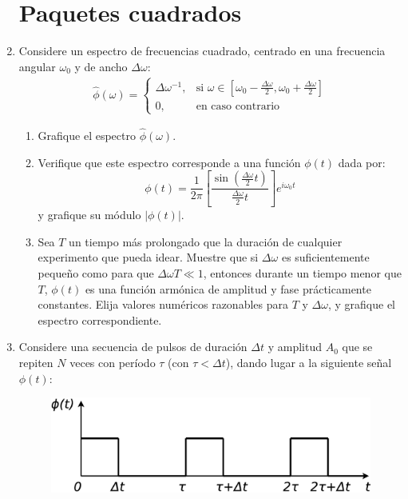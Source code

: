 \documentclass[11pt,spanish]{article}
\begin{document}
\begin{enumerate}
\section*{Paquetes cuadrados}


    \item Considere un espectro de frecuencias cuadrado, centrado en una
    frecuencia angular $\omega_0$ y de ancho $\Delta\omega$:
    \begin{align}\hat{\phi}(\omega) =
        \begin{cases}
            \Delta\omega^{-1}, & \text{si } \omega \in [\omega_0 - \frac{\Delta\omega}{2}, \omega_0 + \frac{\Delta\omega}{2}] \\
            0, & \text{en caso contrario}
        \end{cases}
    \end{align}

    \begin{enumerate}
        \item Grafique el espectro $\hat{\phi}(\omega)$.
        
        \item Verifique que este espectro corresponde a una función $\phi(t)$
        dada por: 
        \[
        \phi(t)=\frac{1}{2\pi}\left[\frac{\sin(\tfrac{\Delta\omega}{2} t )}{\tfrac{\Delta\omega}{2} t}\right]e^{i\omega_{0}t}
        \]
        y grafique su módulo $\left|\phi(t)\right|$.

        \item Sea $T$ un tiempo más prolongado que la duración de cualquier
        experimento que pueda idear. Muestre que si $\Delta\omega$ es
        suficientemente pequeño como para que $\Delta\omega T\ll1$, entonces
        durante un tiempo menor que $T$, $\phi(t)$ es una función armónica de
        amplitud y fase prácticamente constantes. Elija valores numéricos
        razonables para $T$ y $\Delta \omega$, y grafique el espectro
        correspondiente.
    \end{enumerate}



    \item Considere una secuencia de pulsos de duración $\Delta t$ y amplitud
    $A_0$ que se repiten $N$ veces con período $\tau$ (con $\tau < \Delta t$),
    dando lugar a la siguiente señal $\phi(t)$:

    \begin{figure}[H]
        \centering{}\includegraphics[clip,scale=0.25]{figs/ej2-18}
    \end{figure}


\end{enumerate}
\end{document}
